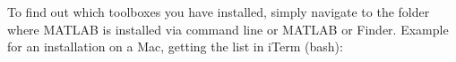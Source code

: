 To find out which toolboxes you have installed, simply navigate to the folder where MATLAB is installed via command line or MATLAB or Finder. Example for an installation on a Mac, getting the list in iTerm (bash):